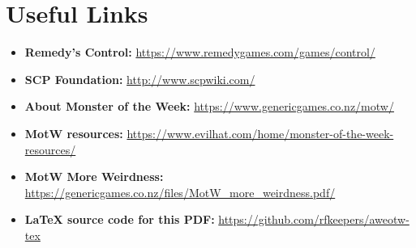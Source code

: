 \documentclass[12pt,oneside,landscape]{memoir}
\begin{document}

\pagebreak

\fontsize{12}{14}\selectfont
\chapter*{Useful Links}
\begin{itemize}

\item \textbf{Remedy’s Control:} \url{https://www.remedygames.com/games/control/}
\item \textbf{SCP Foundation:} \url{http://www.scpwiki.com/}
\item \textbf{About Monster of the Week:} \url{https://www.genericgames.co.nz/motw/}
\item \textbf{MotW resources:} \url{https://www.evilhat.com/home/monster-of-the-week-resources/}
\item \textbf{MotW More Weirdness:} \url{https://genericgames.co.nz/files/MotW_more_weirdness.pdf/}
\item \textbf{{\LaTeX} source code for this PDF:} \url{https://github.com/rfkeepers/aweotw-tex}

\end{itemize}
\pagebreak
\end{document}
